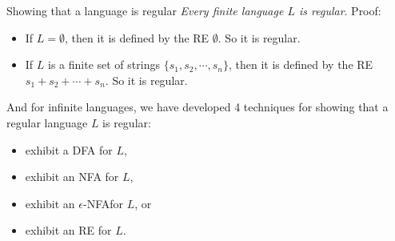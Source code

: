 \documentclass{prosper}%
\newcommand{\e} {{\mbox{$\epsilon$}}}
\begin{document}
\begin{slide}{Showing that a language is regular}
{\em Every finite language $L$ is regular}. Proof: 
\begin{itemize}
\item If $L=\emptyset$, then it is defined by the RE $\emptyset$. So it is regular.
\item If $L$ is a finite set of strings $\{s_1, s_2, \cdots,s_n\}$, then it is defined by the RE $s_1+s_2+\cdots +s_n$. So it is regular.
\end{itemize}
And for infinite languages, we have developed 4 techniques for showing that a regular language $L$ is regular: 
\begin{itemize}
\item exhibit a DFA for $L$, 
\item exhibit an NFA for $L$, 
\item exhibit an \e-NFAfor $L$, or
\item exhibit an RE for $L$.
\end{itemize}
\end{slide} 

\begin{comment}
\begin{slide}{The Pumping Lemma, informally}
\begin{itemize}
\item Suppose $L=\{0^n1^n:n\geq 1\}$ is regular
\item Then it would be recognized by some DFA $A$
with, say, $k$ states. 
\begin{comment}
\[\begin{array}{ll}
\e & p_0\\
0 & p_1\\
00 &p_2\\
\cdots & \cdots\\
0^k&p_k
\end{array}
\]
\item Since there are only $k$ states,  after reading two different prefixes, say $0^i$ and $0^j$, $A$ must be in the same state, say $q$, from which it will start to recognize the 1s.
\begin{itemize}
\item If $\hat{\delta}(q, 1^i)\in F$, then $A$ will foolishly accept $0^j1^i$.
\item If $\hat{\delta}(q, 1^i) \notin F$, then $A$ will foolishly reject $0^i1^i$.
\end{itemize}
\end{itemize}
Therefore, the language is not regular.
\end{slide}
\end{comment}
\end{document}
